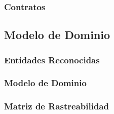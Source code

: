 \newpage


\newpage



\subsubsection{Contratos} %


\subsection{Modelo de Dominio}
\subsubsection{Entidades Reconocidas}
\subsubsection{Modelo de Dominio}
\subsubsection{Matriz de Rastreabilidad}